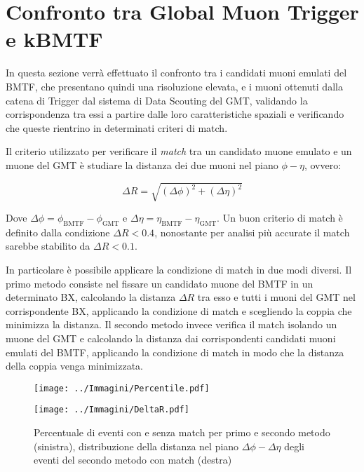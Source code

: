 \section{Confronto tra Global Muon Trigger e kBMTF}
\label{sec:Confronto}

In questa sezione verrà effettuato il confronto tra i candidati muoni emulati del BMTF, che presentano quindi una risoluzione elevata, e i muoni ottenuti dalla catena di Trigger dal sistema di Data Scouting del GMT, validando la corrispondenza tra essi a partire dalle loro caratteristiche spaziali e verificando che queste rientrino in determinati criteri di match. 

Il criterio utilizzato per verificare il \textit{match} tra un candidato muone emulato e un muone del GMT è studiare la distanza dei due muoni nel piano $\phi - \eta$, ovvero:

\begin{equation}
  \label{eq:DeltaR}
  \Delta R = \sqrt{(\Delta \phi)^2 + (\Delta \eta)^2}
\end{equation}

Dove $\Delta \phi = \phi_{\mathrm{BMTF}} - \phi_{\mathrm{GMT}}$ e $\Delta \eta = \eta_{\mathrm{BMTF}} - \eta_{\mathrm{GMT}}$. Un buon criterio di match è definito dalla condizione $\Delta R < 0.4$, nonostante per analisi più accurate il match sarebbe stabilito da $\Delta R < 0.1$.

In particolare è possibile applicare la condizione di match in due modi diversi. Il primo metodo consiste nel fissare un candidato muone del BMTF in un determinato BX, calcolando la distanza $\Delta R$ tra esso e tutti i muoni del GMT nel corrispondente BX, applicando la condizione di match e scegliendo la coppia che minimizza la distanza. \newline
Il secondo metodo invece verifica il match isolando un muone del GMT e calcolando la distanza dai corrispondenti candidati muoni emulati del BMTF, applicando la condizione di match in modo che la distanza della coppia venga minimizzata.




\begin{figure}[t]
  \centering
  \begin{minipage}[b]{0.45\textwidth}
    \centering
    \texttt{[image: ../Immagini/Percentile.pdf]} 
    \end{minipage}
    \hfill 
    \begin{minipage}[b]{0.49\textwidth}
      \centering
      \texttt{[image: ../Immagini/DeltaR.pdf]} 
    \end{minipage}
    \caption{Percentuale di eventi con e senza match per primo e secondo metodo (sinistra), distribuzione della distanza nel piano $\Delta \phi - \Delta \eta$ degli eventi del secondo metodo con match (destra)}
  \label{fig:DeltaR}
\end{figure}


